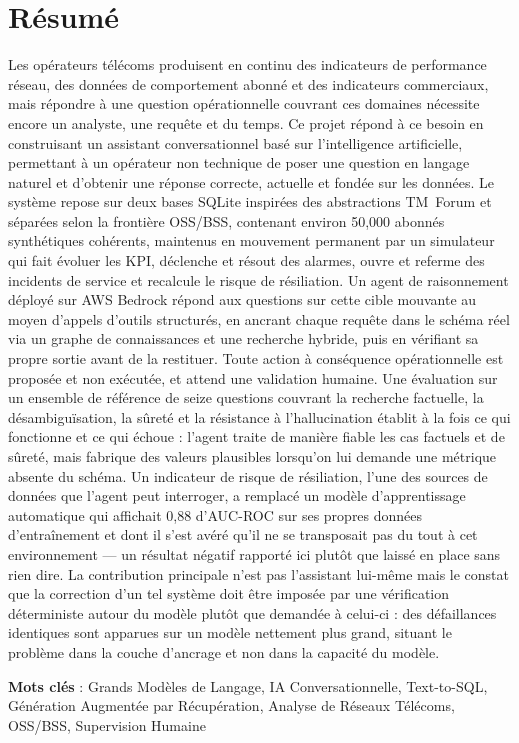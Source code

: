 \section*{Résumé}
\par Les opérateurs télécoms produisent en continu des indicateurs de performance
réseau, des données de comportement abonné et des indicateurs commerciaux, mais
répondre à une question opérationnelle couvrant ces domaines nécessite encore un
analyste, une requête et du temps. Ce projet répond à ce besoin en construisant un
assistant conversationnel basé sur l'intelligence artificielle, permettant à un
opérateur non technique de poser une question en langage naturel et d'obtenir une
réponse correcte, actuelle et fondée sur les données. Le système repose sur deux bases
SQLite inspirées des abstractions TM~Forum et séparées selon la frontière OSS/BSS,
contenant environ 50{,}000 abonnés synthétiques cohérents, maintenus en mouvement
permanent par un simulateur qui fait évoluer les KPI, déclenche et résout des alarmes,
ouvre et referme des incidents de service et recalcule le risque de résiliation. Un
agent de raisonnement déployé sur AWS Bedrock répond aux questions sur cette cible
mouvante au moyen d'appels d'outils structurés, en ancrant chaque requête dans le schéma
réel via un graphe de connaissances et une recherche hybride, puis en vérifiant sa
propre sortie avant de la restituer. Toute action à conséquence opérationnelle est
proposée et non exécutée, et attend une validation humaine. Une évaluation sur un
ensemble de référence de seize questions couvrant la recherche factuelle, la
désambiguïsation, la sûreté et la résistance à l'hallucination établit à la fois ce qui
fonctionne et ce qui échoue : l'agent traite de manière fiable les cas factuels et de
sûreté, mais fabrique des valeurs plausibles lorsqu'on lui demande une métrique absente
du schéma. Un indicateur de risque de résiliation, l'une des
sources de données que l'agent peut interroger, a remplacé un modèle
d'apprentissage automatique qui affichait 0,88 d'AUC-ROC sur ses propres données
d'entraînement et dont il s'est avéré qu'il ne se transposait pas du tout à cet
environnement --- un résultat négatif rapporté ici plutôt que laissé en place
sans rien dire. La contribution principale n'est pas
l'assistant lui-même mais le constat que la correction d'un tel système doit être
imposée par une vérification déterministe autour du modèle plutôt que demandée à
celui-ci : des défaillances identiques sont apparues sur un modèle nettement plus grand,
situant le problème dans la couche d'ancrage et non dans la capacité du modèle.

\textbf{Mots clés} : Grands Modèles de Langage, IA Conversationnelle, Text-to-SQL,
Génération Augmentée par Récupération, Analyse de Réseaux Télécoms, OSS/BSS,
Supervision Humaine
